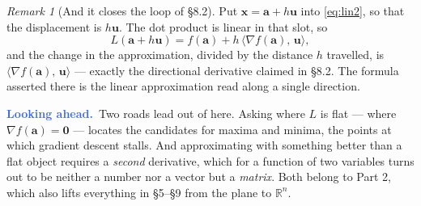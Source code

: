 \documentclass[11pt]{article}
\theoremstyle{plain}
\theoremstyle{definition}
\theoremstyle{remark}
\newtheorem*{rmk}{Remark}
\newcommand{\lookahead}{\par\smallskip\noindent
  \textbf{\sffamily\textcolor{RoyalBlue}{Looking ahead.}}\ \ignorespaces}
\newcommand{\R}{\mathbb{R}}
\newcommand{\vc}[1]{\mathbf{#1}}
\newcommand{\ip}[2]{\langle #1,\, #2\rangle}
\newcommand{\grad}{\nabla}
\begin{document}
\begin{rmk}[And it closes the loop of \S8.2]
Put $\vc{x}=\vc{a}+h\vc{u}$ into \eqref{eq:lin2}, so that the displacement is
$h\vc{u}$. The dot product is linear in that slot, so
\[
  L(\vc{a}+h\vc{u}) = f(\vc{a}) + h\,\ip{\grad f(\vc{a})}{\vc{u}} ,
\]
and the change in the approximation, divided by the distance $h$ travelled, is
$\ip{\grad f(\vc{a})}{\vc{u}}$ --- exactly the directional derivative claimed in
\S8.2. The formula asserted there is the linear approximation read along a
single direction.
\end{rmk}

\lookahead Two roads lead out of here. Asking where $L$ is flat --- where
$\grad f(\vc{a})=\vc{0}$ --- locates the candidates for maxima and minima, the
points at which gradient descent stalls. And approximating with something better
than a flat object requires a \emph{second} derivative, which for a function of
two variables turns out to be neither a number nor a vector but a
\emph{matrix}. Both belong to Part 2, which also lifts everything in \S5--\S9
from the plane to $\R^{n}$.
\end{document}
